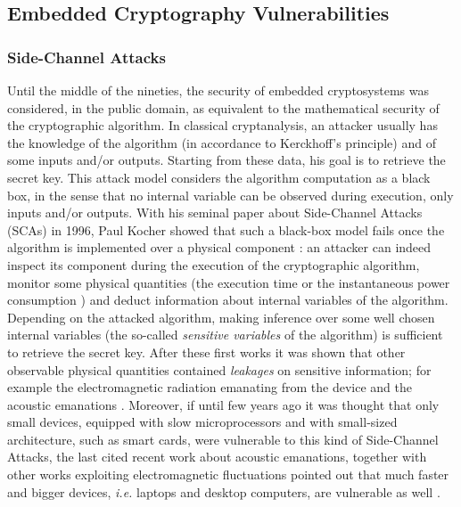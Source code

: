 \subsection{Embedded Cryptography Vulnerabilities}\label{sec:vulnerabilities}
\subsubsection{Side-Channel Attacks}
Until the middle of the nineties, the security of embedded cryptosystems was considered, in the public domain, as equivalent to the mathematical security of the cryptographic algorithm. In classical cryptanalysis, an attacker usually has the knowledge of the algorithm (in accordance to Kerckhoff's principle) and of some inputs and/or outputs. Starting from these data, his goal is to retrieve the secret key. This attack model considers the algorithm computation as a black box, in the sense that no internal variable can be observed during execution, only inputs and/or outputs. With his seminal paper about Side-Channel Attacks (SCAs) in 1996, Paul Kocher showed that such a black-box model fails once the algorithm is implemented over a physical component \cite{kocher1996timing}: an attacker can indeed inspect its component during the execution of the cryptographic algorithm, monitor some physical quantities (\eg the execution time \cite{kocher1996timing} or the instantaneous power consumption \cite{kocher1999differential}) and deduct information about internal variables of the algorithm. Depending on the attacked algorithm, making inference over some well chosen internal variables (the so-called \emph{sensitive variables} of the algorithm) is sufficient to retrieve the secret key. After these first works it was shown that other observable physical quantities contained \emph{leakages} on sensitive information; for example the electromagnetic radiation emanating from the device \cite{gandolfi2001electromagnetic,quisquater2001electromagnetic} and the acoustic emanations \cite{genkin2014rsa}. Moreover, if until few years ago it was thought that only small devices, equipped with slow microprocessors and with small-sized architecture, such as smart cards, were vulnerable to this kind of Side-Channel Attacks, the last cited recent work about acoustic emanations, together with other works exploiting electromagnetic fluctuations pointed out that much faster and bigger devices, \emph{i.e.} laptops and desktop computers, are vulnerable as well \cite{genkin2015stealing,genkin2015get,genkin2016ecdh}.

